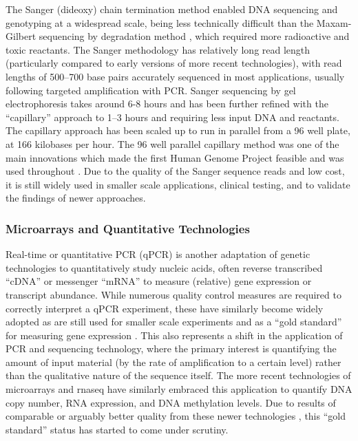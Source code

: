 The Sanger (dideoxy) chain termination method \citep{Sanger1975} enabled DNA sequencing and genotyping at a widespread scale, being less technically difficult than the Maxam-Gilbert sequencing by degradation method \citep{Gilbert1973, Maxam1977}, which required more radioactive and toxic reactants. The Sanger methodology has relatively long read length (particularly compared to early versions of more recent technologies), with read lengths of 500--700 base pairs accurately sequenced in most applications, usually following targeted amplification with PCR. Sanger sequencing by gel electrophoresis takes around 6-8 hours and has been further refined with the ``capillary'' approach to 1--3 hours and requiring less input DNA and reactants. The capillary approach has been scaled up to run in parallel from a 96 well plate, at 166 kilobases per hour. The 96 well parallel capillary method was one of the main innovations which made the first Human Genome Project feasible and was used throughout \citep{Lander2001}. Due to the quality of the Sanger sequence reads and low cost, it is still widely used in smaller scale applications, clinical testing, and to validate the findings of newer approaches.


\subsubsection{Microarrays and Quantitative Technologies}
Real-time or quantitative PCR (\gls{qPCR}) is another adaptation of genetic technologies to quantitatively study nucleic acids, often reverse transcribed ``\gls{cDNA}'' or messenger ``\gls{mRNA}'' to measure (relative) gene expression or transcript abundance. While numerous quality control measures are required to correctly interpret a qPCR experiment, these have similarly become widely adopted as are still used for smaller scale experiments and as a ``gold standard'' for measuring gene expression \citep{Adamski2014}. This also represents a shift in the application of PCR and sequencing technology, where the primary interest is quantifying the amount of input material (by the rate of amplification to a certain level) rather than the qualitative nature of the sequence itself. The more recent technologies of microarrays and \gls{rnaseq} have similarly embraced this application to quantify DNA copy number, RNA expression, and DNA methylation levels. Due to results of comparable or arguably better quality from these newer technologies \citep{Robin2016, Beck2016, McCourt2013, Git2010}, this ``gold standard'' status has started to come under scrutiny.

